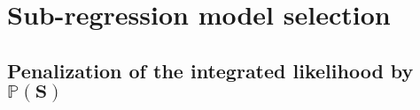 \documentclass[12pt,a4paper]{report}
\begin{document}
\section{Sub-regression model selection}	

%			
%			
%		
%		
%		
%		
		\subsection{Penalization of the integrated likelihood by $\mathbb{P}(\boldsymbol{S})$} \label{compstruct}
		
\end{document}
